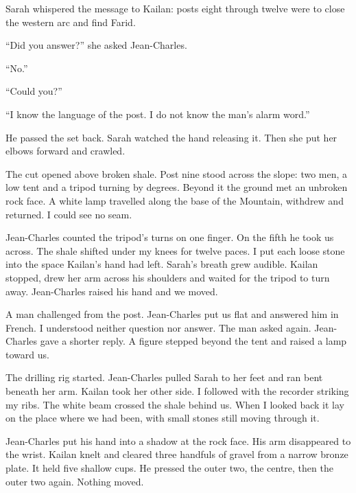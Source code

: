 Sarah whispered the message to Kailan: posts eight through twelve were to close the western arc and find Farid.\par

``Did you answer?'' she asked Jean-Charles.\par

``No.''\par

``Could you?''\par

``I know the language of the post. I do not know the man's alarm word.''\par

He passed the set back. Sarah watched the hand releasing it. Then she put her elbows forward and crawled.\par

The cut opened above broken shale. Post nine stood across the slope: two men, a low tent and a tripod turning by degrees. Beyond it the ground met an unbroken rock face. A white lamp travelled along the base of the Mountain, withdrew and returned. I could see no seam.\par

Jean-Charles counted the tripod's turns on one finger. On the fifth he took us across. The shale shifted under my knees for twelve paces. I put each loose stone into the space Kailan's hand had left. Sarah's breath grew audible. Kailan stopped, drew her arm across his shoulders and waited for the tripod to turn away. Jean-Charles raised his hand and we moved.\par

A man challenged from the post. Jean-Charles put us flat and answered him in French. I understood neither question nor answer. The man asked again. Jean-Charles gave a shorter reply. A figure stepped beyond the tent and raised a lamp toward us.\par

The drilling rig started. Jean-Charles pulled Sarah to her feet and ran bent beneath her arm. Kailan took her other side. I followed with the recorder striking my ribs. The white beam crossed the shale behind us. When I looked back it lay on the place where we had been, with small stones still moving through it.\par

Jean-Charles put his hand into a shadow at the rock face. His arm disappeared to the wrist. Kailan knelt and cleared three handfuls of gravel from a narrow bronze plate. It held five shallow cups. He pressed the outer two, the centre, then the outer two again. Nothing moved.\par

